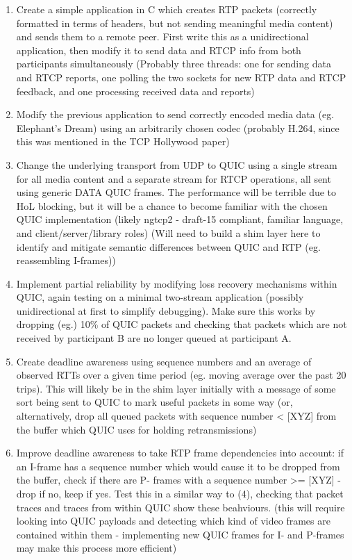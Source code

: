 \documentclass{mprop}
\begin{document}
\begin{enumerate}
  \item Create a simple application in C which creates RTP packets (correctly formatted in terms 
  of headers, but not sending meaningful media content) and sends them to a remote peer. First 
  write this as a unidirectional application, then modify it to send data and RTCP info from both 
  participants simultaneously (Probably three threads: one for sending data and RTCP reports, one 
  polling the two sockets for new RTP data and RTCP feedback, and one processing received data 
  and reports)

  \item Modify the previous application to send correctly encoded media data (eg. Elephant's 
  Dream) using an arbitrarily chosen codec (probably H.264, since this was mentioned in the TCP 
  Hollywood paper)

  \item Change the underlying transport from UDP to QUIC using a single stream for all media 
  content and a separate stream for RTCP operations, all sent using generic DATA QUIC frames. The 
  performance will be terrible due to HoL blocking, but it will be a chance to become familiar 
  with the chosen QUIC implementation (likely ngtcp2 - draft-15 compliant, familiar language, and 
  client/server/library roles) (Will need to build a shim layer here to identify and mitigate 
  semantic differences between QUIC and RTP (eg. reassembling I-frames))

  \item Implement partial reliability by modifying loss recovery mechanisms within QUIC, again 
  testing on a minimal two-stream application (possibly unidirectional at first to simplify 
  debugging). Make sure this works by dropping (eg.) 10\% of QUIC packets and checking that 
  packets which are not received by participant B are no longer queued at participant A.

  \item Create deadline awareness using sequence numbers and an average of observed RTTs over a 
  given time period (eg. moving average over the past 20 trips). This will likely be in the shim 
  layer initially with a message of some sort being sent to QUIC to mark useful packets in some 
  way (or, alternatively, drop all queued packets with sequence number < [XYZ] from the buffer 
  which QUIC uses for holding retransmissions)

  \item Improve deadline awareness to take RTP frame dependencies into account: if an I-frame has 
  a sequence number which would cause it to be dropped from the buffer, check if there are P-
  frames with a sequence number >= [XYZ] - drop if no, keep if yes. Test this in a similar way to 
  (4), checking that packet traces and traces from within QUIC show these beahviours. (this will 
  require looking into QUIC payloads and detecting which kind of video frames are contained 
  within them - implementing new QUIC frames for I- and P-frames may make this process more 
  efficient)


\end{enumerate}
\end{document}
